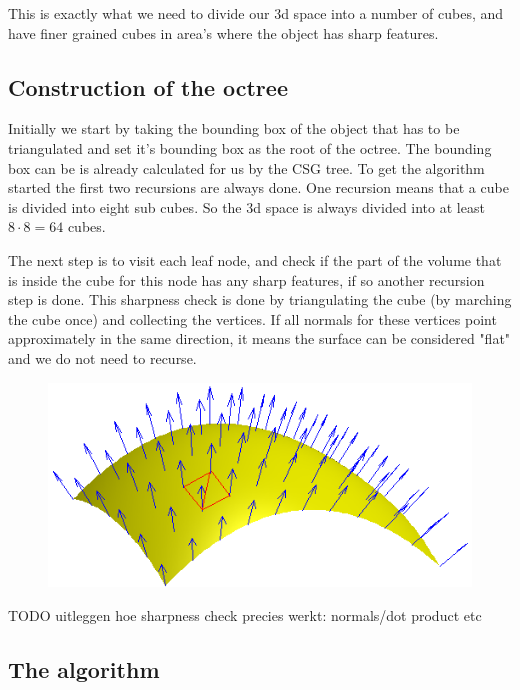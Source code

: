 \documentclass[a4paper,10pt,twoside]{report}
\begin{document}
This is exactly what we need to divide our 3d space into a number of cubes, and have finer grained cubes in area's where the object has sharp features.

\subsection{Construction of the octree}
\label{sect:genoctree}
Initially we start by taking the bounding box of the object that has to be triangulated and set it's bounding box as the root of the octree. The bounding box can be is already calculated for us by the CSG tree. To get the algorithm started the first two recursions are always done. One recursion means that a cube is divided into eight sub cubes. So the 3d space is always divided into at least $8 \cdot 8 = 64$ cubes.

The next step is to visit each leaf node, and check if the part of the volume that is inside the cube for this node has any sharp features, if so another recursion step is done. This sharpness check is done by triangulating the cube (by marching the cube once) and collecting the vertices. If all normals for these vertices point approximately in the same direction, it means the surface can be considered "flat" and we do not need to recurse.


    \begin{figure}[h]
        \begin{center}
            \includegraphics[scale=0.4]{./images/Surface_normal}
        \end{center}
        \caption{}
        \label{figure:surface_normal}
    \end{figure}

TODO uitleggen hoe sharpness check precies werkt: normals/dot product etc

\subsection{The algorithm}
\end{document}
